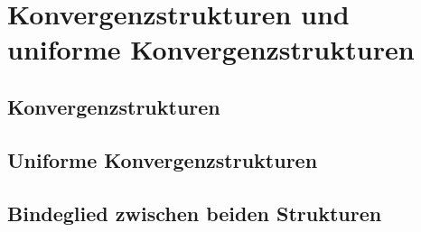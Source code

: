 
\section{Konvergenzstrukturen und uniforme Konvergenzstrukturen}

\subsection{Konvergenzstrukturen}
\subsection{Uniforme Konvergenzstrukturen}
\subsection{Bindeglied zwischen beiden Strukturen}

